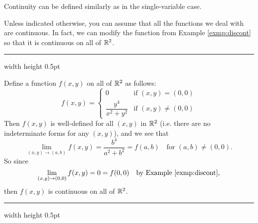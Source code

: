 Continuity can be defined similarly as in the single-variable case.


Unless indicated otherwise, you can assume that all the functions we deal with are continuous. 
In fact, we can
modify the function from Example \ref{exmp:discont} so that it is continuous on all of $\mathbb{R}^{2}$.

\medskip
\hrule width \textwidth height 0.5pt
\begin{exmp}
 Define a function $f(x,y)$ on all of $\mathbb{R}^{2}$ as follows:
 \begin{displaymath}
  f(x,y) =
  \begin{cases}
   0 & \text{if $(x,y) = (0,0)$}\\
   \dfrac{y^4}{x^2 + y^2} & \text{if $(x,y) \ne (0,0)$}
  \end{cases}
 \end{displaymath}
 Then $f(x,y)$ is well-defined for all $(x,y)$ in $\mathbb{R}^{2}$ (i.e. there are no indeterminate forms for any
 $(x,y)$), and we see that
 \begin{displaymath}
  \lim_{(x,y) \to (a,b)} f(x,y) = \frac{b^4}{a^2 + b^2} = f(a,b) \text{~~~for $(a,b) \ne (0,0)$.}
 \end{displaymath}
 So since 
 \begin{displaymath}
  \lim_{(x,y) \to (0,0)} f(x,y) = 0 = f(0,0) \text{~~~by Example \ref{exmp:discont},}
 \end{displaymath}
 then $f(x,y)$ is continuous on all of $\mathbb{R}^{2}$.
\end{exmp}
\hrule width \textwidth height 0.5pt

